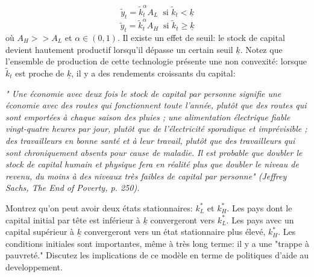 \documentclass[11pt,a4paper]{article}
\begin{document}
\begin{enumerate}
\begin{equation*}
\tilde{y}_t=\tilde{k}_t^{\alpha }A_{L} \ \text{ si } \tilde{k}_t < \underline{k}\end{equation*}%
\begin{equation*}
\tilde{y}_t=\tilde{k}_t^{\alpha }A_{H} \ \text{ si } \tilde{k}_t \geq \underline{k}\end{equation*}%
o\`{u} $A_H>>A_L$ et $\alpha \in (0,1).$ %
Il existe un effet de seuil:  le stock de capital devient hautement productif 
 lorsqu'il dépasse un certain seuil $\underline{k}$. Notez que l'ensemble de production de cette technologie présente une non convexité: lorsque $\tilde{k}_t$ est proche de $\underline{k}$, il y a des rendements croissants du capital:   
 
 
 \textit{" Une économie avec deux fois le stock de capital par personne signifie une économie avec des routes qui fonctionnent toute l'année, plutôt que des routes qui sont emportées à chaque saison des pluies ; une alimentation électrique fiable
 vingt-quatre heures par jour, plutôt que de l'électricité sporadique et imprévisible ; des travailleurs en bonne santé et à leur travail, plutôt que des travailleurs qui sont chroniquement absents pour cause de maladie. Il est probable que doubler le stock de capital humain et physique fera en réalité plus que doubler le niveau de revenu, du moins à des niveaux très faibles de capital par personne" (Jeffrey Sachs, The End of Poverty, p. 250).}

Montrez qu'on peut  avoir deux états stationnaires: $k_L^{\ast }$ et $k_H^{\ast }$. Les pays dont le capital initial par t\^{e}te est inférieur à $\underline{k}$ convergeront vers $k_L^{\ast }$. Les pays avec un capital supérieur à $\underline{k}$ convergeront vers un état stationnaire plus élevé, $k_H^{\ast }$. Les conditions initiales sont importantes, même à très long terme: il y a une "trappe à pauvreté."  Discutez les implications de ce modèle en terme de politiques d'aide au developpement. 
\end{enumerate}
\end{document}
